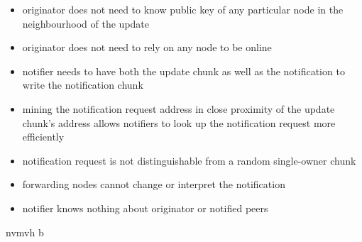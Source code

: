 \begin{itemize}
    \item originator does not need to know public key of any particular node in the neighbourhood of the update
    \item originator does not need to rely on any node to be online
    \item notifier needs to have both the update chunk as well as the notification to write the notification chunk
    \item mining the notification request address in close proximity of the update chunk's address allows notifiers to look up the notification request more efficiently
    \item notification request is not distinguishable from a random single-owner chunk
    \item forwarding nodes cannot change or interpret the notification 
    \item notifier knows nothing about originator or notified peers
\end{itemize}

nvmvh b 